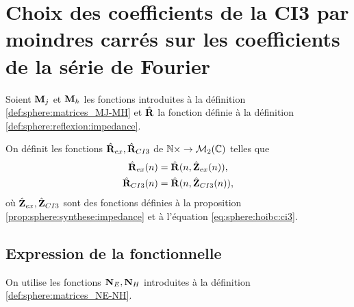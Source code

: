 \section[Choix 2 du calcul des coefficients de la CI3]{Choix des coefficients de la CI3 par moindres carrés sur les coefficients de la série de Fourier}

  Soient \(\mathbf{M}_j\) et \(\mathbf{M}_h\) les fonctions introduites à la définition \ref{def:sphere:matrices_MJ-MH} et \(\hat{\mathbf{R}}\) la fonction définie à la définition \ref{def:sphere:reflexion:impedance}.

  \begin{defn}%
    \label{def:sphere:minimisation:matrices_MR}
    On définit les fonctions \(\hat{\mathbf{R}}_{ex}, \hat{\mathbf{R}}_{CI3}\) de \(\mathbb N\times \rightarrow \mathcal{M}_2(\mathbb C)\) telles que
    \begin{align*}
      \hat{\mathbf{R}}_{ex}(n) &= \hat{\mathbf{R}}(n, \hat{\mathbf{Z}}_{ex}(n)),
      \\
      \hat{\mathbf{R}}_{CI3}(n) &= \hat{\mathbf{R}}(n, \hat{\mathbf{Z}}_{CI3}(n)),
    \end{align*}
    où \(\hat{\mathbf{Z}}_{ex},\hat{\mathbf{Z}}_{CI3}\) sont des fonctions définies à la proposition \ref{prop:sphere:synthese:impedance} et à l'équation \eqref{eq:sphere:hoibc:ci3}.
  \end{defn}

  \subsection{Expression de la fonctionnelle}

    On utilise les fonctions \(\mathbf{N}_E, \mathbf{N}_H\) introduites à la définition \ref{def:sphere:matrices_NE-NH}.

